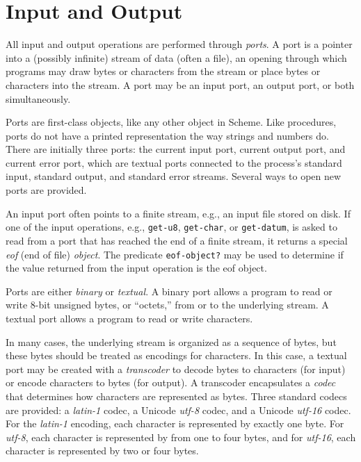 \chapter{Input and Output\label{io_CHPTIO}}
\label{io_g121}
\label{io_h0}
\begin{figure}[H]
\centering
\setlength{\fboxrule}{3pt}
\end{figure}
\clearpage





\label{io_s0}\label{io_s1}\label{io_s2}All input and output operations are performed through \textit{ports}.
A port is a pointer into a (possibly infinite) stream of data
(often a \label{io_s3}file), an opening through which programs may draw bytes
or characters from the stream or place bytes or characters into the stream.
A port may be an input port, an output port, or both simultaneously.


Ports are first-class objects, like any other object in Scheme.
Like procedures, ports do not have a printed representation the way strings
and numbers do.
There are initially three ports: the current input port,
current output port, and current error port, which are textual ports
connected to the process's standard input, standard output, and
standard error streams.
Several ways to open new ports are provided.


An input port often points to a finite stream, e.g., an input
file stored on disk.
If one of the input operations, e.g., \texttt{get-u8}, \texttt{get-char}, or
\texttt{get-datum}, is asked to
read from a port that has reached the end of a finite stream, it returns
a special \label{io_s4}\textit{eof} (end of file) \textit{object}.
The predicate \label{io_s5}\texttt{eof-object?} may be used
to determine if the value returned from the input operation is the eof
object.


\label{io_s6}\label{io_s7}\label{io_s8}Ports are either \textit{binary} or \textit{textual}.
A binary port allows a program to read or write 8-bit unsigned bytes, or
``octets,'' from or to the underlying stream.
A textual port allows a program to read or write characters.


\label{io_s9}\label{io_s10}\label{io_s11}\label{io_s12}\label{io_s13}In many cases, the underlying stream is organized as a sequence of bytes,
but these bytes should be treated as encodings for characters.
In this case, a textual port may be created with a \textit{transcoder} to
decode bytes to characters (for input) or encode characters to bytes (for
output).
A transcoder encapsulates a \textit{codec} that determines how characters
are represented as bytes.
Three standard codecs are provided: a \textit{latin-1} codec, a Unicode
\textit{utf-8} codec, and a Unicode \textit{utf-16} codec.
For the \textit{latin-1} encoding, each character is represented by exactly
one byte.
For \textit{utf-8}, each character is represented by from one
to four bytes, and for \textit{utf-16}, each character is represented by
two or four bytes.


